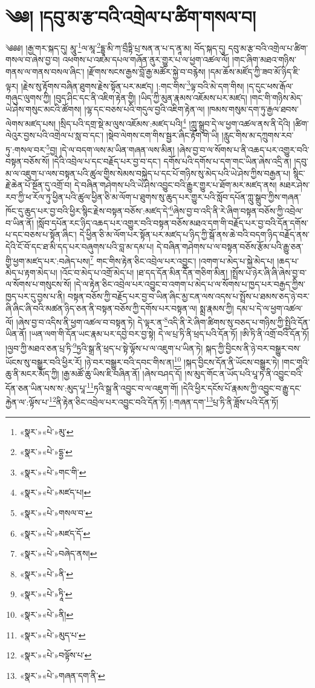\chapter{༄༅། །དབུ་མ་རྩ་བའི་འགྲེལ་པ་ཚིག་གསལ་བ།}༄༅༅། །རྒྱ་གར་སྐད་དུ། མཱུ་\footnote{«སྣར་»«པེ་»མུ་}ལ་མཱ་\footnote{«སྣར་»«པེ་»དྷྱ་}དྷྱཱ་མི་ཀ་བྲྀཏྟི་པྲ་སན་ན་པ་ད་ནཱ་མ། བོད་སྐད་དུ། དབུ་མ་རྩ་བའི་འགྲེལ་པ་ཚིག་གསལ་བ་ཞེས་བྱ་བ། འཕགས་པ་འཇམ་དཔལ་གཞོན་ནུར་གྱུར་པ་ལ་ཕྱག་འཚལ་ལོ། །གང་ཞིག་མཐའ་གཉིས་གནས་ལ་གནས་བསལ་ཞིང་། །རྫོགས་སངས་རྒྱས་བློ་རྒྱ་མཚོར་སྐྱེ་བ་བརྙེས། །དམ་ཆོས་མཛོད་ཀྱི་ཟབ་མོ་ཉིད་ཇི་ལྟར། །རྗེས་སུ་རྟོགས་བཞིན་ཐུགས་རྗེས་སྟོན་པར་མཛད། །:གང་གིས་\footnote{«སྣར་»«པེ་»གང་གི་}ལྟ་བའི་མེ་དག་གིས། །ད་དུང་ཕས་རྒོལ་གཞུང་ལུགས་ཀྱི། །བུད་ཤིང་དང་ནི་འཇིག་རྟེན་གྱི། །ཡིད་ཀྱི་མུན་རྣམས་འཇོམས་པར་མཛད། །གང་གི་གཉིས་མེད་ཡེ་ཤེས་གསུང་མངའི་ཚོགས། །ལྷ་དང་བཅས་པའི་གདུལ་བྱའི་འཇིག་རྟེན་ལ། །ཁམས་གསུམ་དག་ཏུ་རྒྱལ་ཐབས་ལེགས་མཛད་པས། །སྲིད་པའི་དགྲ་སྡེ་མ་ལུས་འཇོམས་:མཛད་པའི།\footnote{«སྣར་»«པེ་»མཛད་པ།} །ཀླུ་སྒྲུབ་དེ་ལ་ཕྱག་འཚལ་ནས་ནི་དེའི། །ཚིག་ལེའུར་བྱས་པའི་འགྲེལ་པ་སླ་བ་དང་། །སྡེབ་ལེགས་ངག་གིས་སྦྱར་ཞིང་རྟོག་གེ་ཡི། །རླུང་གིས་མ་དཀྲུགས་རབ་ཏུ་:གསལ་བར་\footnote{«སྣར་»«པེ་»གསལ་བ་}བྱ། །དེ་ལ་བདག་ལས་མ་ཡིན་གཞན་ལས་མིན། །ཞེས་བྱ་བ་ལ་སོགས་པ་ནི་འཆད་པར་འགྱུར་བའི་བསྟན་བཅོས་སོ། །དེའི་འབྲེལ་པ་དང་བརྗོད་པར་བྱ་བ་དང་། དགོས་པའི་དགོས་པ་དག་གང་ཡིན་ཞེས་འདྲི་ན། །དབུ་མ་ལ་འཇུག་པ་ལས་བསྟན་པའི་ཚུལ་གྱིས་སེམས་བསྐྱེད་པ་དང་པོ་གཉིས་སུ་མེད་པའི་ཡེ་ཤེས་ཀྱིས་བརྒྱན་པ། སྙིང་རྗེ་ཆེན་པོ་སྔོན་དུ་འགྲོ་བ། དེ་བཞིན་གཤེགས་པའི་ཡེ་ཤེས་འབྱུང་བའི་རྒྱུར་གྱུར་པ་ཐོག་མར་མཛད་ནས། མཐར་ཤེས་རབ་ཀྱི་ཕ་རོལ་ཏུ་ཕྱིན་པའི་ཚུལ་ཕྱིན་ཅི་མ་ལོག་པ་ཐུགས་སུ་ཆུད་པར་གྱུར་པའི་སློབ་དཔོན་ཀླུ་སྒྲུབ་ཀྱིས་གཞན་ཁོང་དུ་ཆུད་པར་བྱ་བའི་ཕྱིར་སྙིང་རྗེས་བསྟན་བཅོས་:མཛད་དེ་\footnote{«སྣར་»«པེ་»མཛད་དོ་}ཞེས་བྱ་བ་འདི་ནི་རེ་ཞིག་བསྟན་བཅོས་ཀྱི་འབྲེལ་བ་ཡིན་ནོ། །སློབ་དཔོན་རང་ཉིད་འཆད་པར་འགྱུར་བའི་བསྟན་བཅོས་མཐའ་དག་གི་བརྗོད་པར་བྱ་བའི་དོན་དགོས་པ་དང་བཅས་པ་སྟོན་ཞིང་། དེ་ཕྱིན་ཅི་མ་ལོག་པར་སྟོན་པར་མཛད་པ་ཉིད་ཀྱི་སྒོ་ནས་ཆེ་བའི་བདག་ཉིད་བརྗོད་ནས་དེའི་ངོ་བོ་དང་ཐ་མི་དད་པར་བཞུགས་པའི་བླ་མ་དམ་པ། དེ་བཞིན་གཤེགས་པ་ལ་བསྟན་བཅོས་རྩོམ་པའི་རྒྱུ་ཅན་གྱི་ཕྱག་མཛད་པར་:བཞེད་པས།\footnote{«སྣར་»«པེ་»བཞེད་ནས།} གང་གིས་རྟེན་ཅིང་འབྲེལ་པར་འབྱུང་། །འགག་པ་མེད་པ་སྐྱེ་མེད་པ། །ཆད་པ་མེད་པ་རྟག་མེད་པ། །འོང་བ་མེད་པ་འགྲོ་མེད་པ། །ཐ་དད་དོན་མིན་དོན་གཅིག་མིན། །སྤྲོས་པ་ཉེར་ཞི་ཞི་ཞེས་བྱ་བ་ལ་སོགས་པ་གསུངས་སོ། །དེ་ལ་རྟེན་ཅིང་འབྲེལ་པར་འབྱུང་བ་འགག་པ་མེད་པ་ལ་སོགས་པ་ཁྱད་པར་བརྒྱད་ཀྱིས་ཁྱད་པར་དུ་བྱས་པ་ནི། བསྟན་བཅོས་ཀྱི་བརྗོད་པར་བྱ་བ་ཡིན་ཞིང་མྱ་ངན་ལས་འདས་པ་སྤྲོས་པ་ཐམས་ཅད་ཉེ་བར་ཞི་ཞིང་ཞི་བའི་མཚན་ཉིད་ཅན་ནི་བསྟན་བཅོས་ཀྱི་དགོས་པར་བསྟན་ལ། སྨྲ་རྣམས་ཀྱི། དམ་པ་དེ་ལ་ཕྱག་འཚལ་ལོ། །ཞེས་བྱ་བ་འདིས་ནི་ཕྱག་འཚལ་བ་བསྟན་ཏེ། དེ་ལྟར་ན་\footnote{«སྣར་»«པེ་»ནི་}འདི་ནི་རེ་ཞིག་ཚིགས་སུ་བཅད་པ་གཉིས་ཀྱི་སྤྱིའི་དོན་ཡིན་ནོ། །ཡན་ལག་གི་དོན་ཡང་རྣམ་པར་དབྱེ་བར་བྱ་སྟེ། དེ་ལ་པྲ་ཏི་ནི་ཕྲད་པའི་དོན་ཏོ། །ཨི་ཏི་ནི་འགྲོ་བའི་དོན་ཏོ། །ལྱབ་ཀྱི་མཐའ་ཅན་པྲ་ཏི་\footnote{«སྣར་»«པེ་»ཏཱི་}ཏྱའི་སྒྲ་ནི་ཕྲད་པ་སྟེ་ལྟོས་པ་ལ་འཇུག་པ་ཡིན་ཏེ། སྐད་ཀྱི་བྱིངས་ནི་ཉེ་བར་བསྒྱུར་བས་ཡོངས་སུ་བསྒྱུར་བའི་ཕྱིར་རོ། །ཉེ་བར་བསྒྱུར་བའི་དབང་གིས་ན།\footnote{«སྣར་»«པེ་»ནི།} །སྐད་བྱིངས་དོན་ནི་ཡོངས་བསྒྱུར་ཏེ། །གང་གཱའི་ཆུ་ནི་མངར་མོད་ཀྱི། །རྒྱ་མཚོ་ཆུ་ཡིས་ཇི་བཞིན་ནོ། །ཞེས་བཤད་དོ། །ས་མུད་གོང་ན་ཡོད་པའི་པཱ་ཏ་ནི་འབྱུང་བའི་དོན་ཅན་ཡིན་པས་ས་:མུད་པཱ་\footnote{«སྣར་»«པེ་»མུད་པ་}ཏའི་སྒྲ་ནི་འབྱུང་བ་ལ་འཇུག་གོ། །དེའི་ཕྱིར་དངོས་པོ་རྣམས་ཀྱི་འབྱུང་བ་རྒྱུ་དང་རྐྱེན་ལ་:ལྟོས་པ་\footnote{«སྣར་»«པེ་»བལྟོས་པ་}ནི་རྟེན་ཅིང་འབྲེལ་པར་འབྱུང་བའི་དོན་ཏོ། །:གཞན་དག་\footnote{«སྣར་»«པེ་»གཞན་དག་ནི་}པྲ་ཏི་ནི་ཟློས་པའི་དོན་ཏོ། 